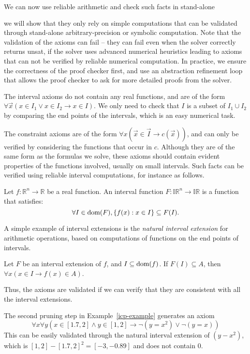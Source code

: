 \documentclass[12pt]{article}
\begin{document}
We can now use reliable arithmetic and check such facts in stand-alone 


we will show that they only rely on simple computations that can be validated through stand-alone arbitrary-precision or symbolic computation. Note that the validation of the axioms can fail -- they can fail even when the solver correctly returns {\sf unsat}, if the solver uses advanced numerical heuristics leading to axioms that can not be verified by reliable numerical computation. In practice, we ensure the correctness of the proof checker first, and use an abstraction refinement loop that allows the proof checker to ask for more detailed proofs from the solver.

The interval axioms do not contain any real functions, and are of the form
$\forall \vec x(x\in I_1\vee x\in I_2\rightarrow x\in I)$. We only need to
check that $I$ is a subset of $I_1\cup I_2$ by comparing the end points of the
intervals, which is an easy numerical task.

The constraint axioms are of the form $\forall x (\vec x\in \vec I \rightarrow
c(\vec x))$, and can only be verified by considering the functions that
occur in $c$. Although they are of the same form as the formulas we solve,
these axioms should contain evident properties of the functions involved,
usually on small intervals. Such facts can be verified using reliable interval
computations, for instance as follows.
\begin{definition}
Let $f: \mathbb{R}^n\rightarrow \mathbb{R}$ be a real function. An interval
function $F: \mathbb{IR}^n \rightarrow \mathbb{IR}$ is a function that
satisfies:
$$\forall I\in \mbox{dom}(F), \{f(x): x\in I\}\subseteq F(I).$$
\end{definition}
A simple example of interval extensions is the {\em natural interval
extension} for
arithmetic operations, based on computations of functions on the end points of
intervals.

\begin{proposition}
Let $F$ be an interval extension of $f$, and $I\subseteq \mbox{dom}(f)$. If
$F(I)\subseteq A$, then $\forall x (x\in I \rightarrow f(x)\in A)$.
\end{proposition}
Thus, the axioms are validated if we can verify that they are consistent with
all the interval extensions.
\begin{example}
The second pruning step in Example~\ref{icp-example} generates an axiom
$$\forall
x \forall y ( x\in [1.7, 2] \wedge y\in [1, 2] \rightarrow \neg (y=
x^2)\vee \neg (y=x))$$
This can be easily validated through the natural interval extension of
$(y-x^2)$, which is $[1,2]-[1.7,2]^2 = [-3, -0.89]$ and does not contain $0$.
\end{example}
\end{document}
